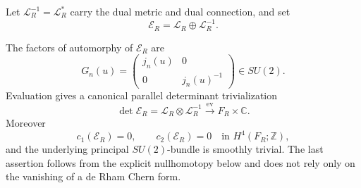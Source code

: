 Let \(\mathscr L_R^{-1}=\mathscr L_R^*\) carry the dual metric and dual
connection, and set
\begin{equation}
 \mathscr E_R=\mathscr L_R\oplus\mathscr L_R^{-1}.
 \label{cusp-magnetic-rank-two-bundle}
\end{equation}

\begin{proposition}
\label{cusp-magnetic-su2-triviality}
The factors of automorphy of \(\mathscr E_R\) are
\[
 G_n(u)=\begin{pmatrix}j_n(u)&0\\0&j_n(u)^{-1}\end{pmatrix}\in SU(2).
\]
Evaluation gives a canonical parallel determinant trivialization
\[
 \det\mathscr E_R=\mathscr L_R\otimes\mathscr L_R^{-1}
 \xrightarrow{\ \mathrm{ev}\ }F_R\times\mathbb C.
\]
Moreover
\[
 c_1(\mathscr E_R)=0,
 \qquad
 c_2(\mathscr E_R)=0\quad\text{in }H^4(F_R;\mathbb Z),
\]
and the underlying principal \(SU(2)\)-bundle is smoothly trivial.  The
last assertion follows from the explicit nullhomotopy below and does not
rely only on the vanishing of a de Rham Chern form.
\end{proposition}

